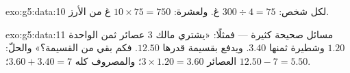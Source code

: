 \begin{solution}{exo:g5:data:10}
لكل شخص: $300 \div 4 = 75$ غ. ولعشرة:
$10 \times 75 = 750$ غ من الأرز.
\end{solution}

\begin{solution}{exo:g5:data:11}
مسائل صحيحة كثيرة --- فمثلًا: «يشتري مالك $3$ عصائر ثمن الواحدة
$1.20$ وشطيرة ثمنها $3.40$. ويدفع بقسيمة قدرها $12.50$.
فكم بقي من القسيمة؟» والحلّ: العصائر
$3 \times 1.20 = 3.60$؛ والمصروف كله $3.60 + 3.40 = 7$؛ 
$12.50 - 7 = 5.50$.
\end{solution}
